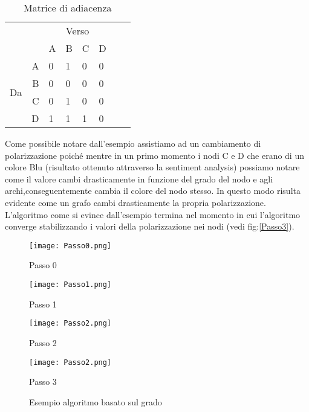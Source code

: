 \begin{table}[!htb]
\centering
\begin{tabular}{|lr|l|l|l|l|l|l|} \cline{3-6}
\multicolumn{1}{l}{} && \multicolumn{4}{c|}{Verso} \\ \cline{3-6}
\multicolumn{1}{l}{} & & A & B & C & D\\ \hline
\multirow{4}{*}{\begin{sideways}Da\end{sideways}}
& \multicolumn{1}{|r|}{A} & 0  & 1  & 0  & 0 \\ \cline{2-6}
& \multicolumn{1}{|r|}{B} & 0  & 0  & 0  & 0 \\ \cline{2-6}
& \multicolumn{1}{|r|}{C} & 0  & 1  & 0  & 0 \\ \cline{2-6}
& \multicolumn{1}{|r|}{D} & 1  & 1  & 1  & 0 \\ \hline

\end{tabular}
\caption{Matrice di adiacenza}
\label{matrice}
\end{table}
Come possibile notare dall'esempio assistiamo ad un cambiamento di polarizzazione poiché mentre in un primo momento i nodi C e D che erano di un colore Blu (risultato ottenuto attraverso la sentiment analysis) possiamo notare come il valore cambi drasticamente in funzione del grado del nodo e agli archi,conseguentemente cambia il colore del nodo stesso. In questo modo risulta evidente come un grafo cambi drasticamente la propria polarizzazione. L'algoritmo come si evince dall'esempio termina nel momento in cui l'algoritmo converge stabilizzando i valori della polarizzazione nei nodi (vedi fig:\ref{Passo3}).
\begin{figure}[htbp]
\centering
\begin{minipage}[c]{.40\textwidth}
\centering\setlength{\captionmargin}{0pt}%
\texttt{[image: Passo0.png]}
\caption{Passo 0}
\label{Passo0}
\end{minipage}%
\hspace{10mm}%
\begin{minipage}[c]{.40\textwidth}
\centering\setlength{\captionmargin}{0pt}%
\texttt{[image: Passo1.png]}
\caption{Passo 1}
\label{Passo1}
\end{minipage}
\hspace{10mm}%
\begin{minipage}[c]{.40\textwidth}
\centering\setlength{\captionmargin}{0pt}%
\texttt{[image: Passo2.png]}
\caption{Passo 2}
\label{Passo2}
\end{minipage}
\hspace{10mm}%
\begin{minipage}[c]{.40\textwidth}
\centering\setlength{\captionmargin}{0pt}%
\texttt{[image: Passo2.png]}
\caption{Passo 3}
\label{Passo3}
\end{minipage}
\caption{Esempio algoritmo basato sul grado}\label{fig:minipage2}
\end{figure}

